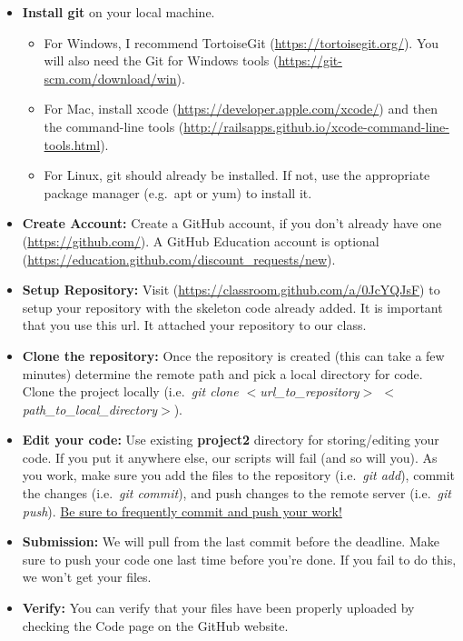 \documentclass[a4paper,12pt]{article}
\begin{document}
\begin{itemize}
\item \textbf{Install git} on your local machine. 
\begin{itemize}
\item For Windows, I recommend TortoiseGit (\url{https://tortoisegit.org/}). You will also need the Git for Windows tools (\url{https://git-scm.com/download/win}).
\item For Mac, install xcode (\url{https://developer.apple.com/xcode/}) and then the command-line tools (\url{http://railsapps.github.io/xcode-command-line-tools.html}). 
\item For Linux, git should already be installed. If not, use the appropriate package manager (e.g.\ apt or yum) to install it.
\end{itemize}

\item \textbf{Create Account:} Create a GitHub account, if you don't already have one (\url{https://github.com/}). A GitHub Education account is optional (\url{https://education.github.com/discount_requests/new}).

\item \textbf{Setup Repository:} Visit (\url{https://classroom.github.com/a/0JcYQJsF}) to setup your repository with the skeleton code already added. It is important that you use this url. It attached your repository to our class.


\item \textbf{Clone the repository:} Once the repository is created (this can take a few minutes) determine the remote path and pick a local directory for code. Clone the project locally (i.e.\ \textit{git clone $<$url\_to\_repository$>$ $<$path\_to\_local\_directory$>$}).

\item \textbf{Edit your code:} Use existing \textbf{project2} directory for storing/editing your code. If you put it anywhere else, our scripts will fail (and so will you). As you work, make sure you add the files to the repository (i.e.\ \textit{git add}), commit the changes (i.e.\ \textit{git commit}), and push changes to the remote server (i.e.\ \textit{git push}). \underline{Be sure to frequently commit and push your work!}

\item \textbf{Submission:} We will pull from the last commit before the deadline. Make sure to push your code one last time before you're done. If you fail to do this, we won't get your files.  

\item \textbf{Verify:} You can verify that your files have been properly uploaded by checking the Code page on the GitHub website.

\end{itemize}
\end{document}

